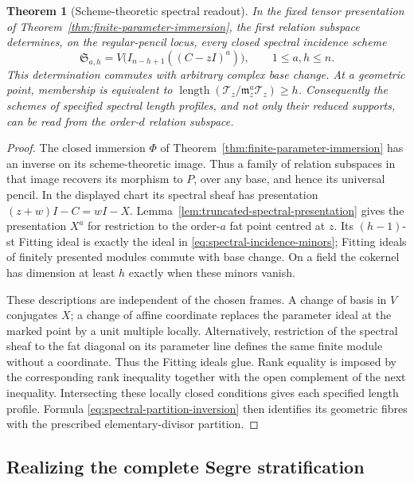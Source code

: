 \documentclass[11pt,reqno]{amsart}
\numberwithin{equation}{section}
\newtheorem{theorem}{Theorem}[section]
\theoremstyle{definition}\newtheorem{definition}[theorem]{Definition}
\theoremstyle{remark}\newtheorem{remark}[theorem]{Remark}
\DeclareMathOperator{\length}{length}
\begin{document}
\begin{theorem}[Scheme-theoretic spectral readout]
\label{thm:relative-spectral-readout}
In the fixed tensor presentation of
Theorem~\ref{thm:finite-parameter-immersion}, the first relation
subspace determines, on the regular-pencil locus, every closed
spectral incidence scheme
\begin{equation}\label{eq:spectral-incidence-minors}
 \mathfrak S_{a,h}
       =V\bigl(I_{n-h+1}((C-zI)^a)\bigr),
       \qquad 1\le a,h\le n.
\end{equation}
This determination commutes with arbitrary complex base change.
At a geometric point, membership is equivalent to
\(\length(\mathcal T_z/\mathfrak m_z^a\mathcal T_z)\ge h\).
Consequently the schemes of specified spectral length profiles, and
not only their reduced supports, can be read from the order-\(d\)
relation subspace.
\end{theorem}
\begin{proof}
The closed immersion \(\Phi\) of
Theorem~\ref{thm:finite-parameter-immersion} has an inverse on its
scheme-theoretic image.  Thus a family of relation subspaces in that
image recovers its morphism to \(P\), over any base, and hence its
universal pencil.  In the displayed chart its spectral sheaf has
presentation \((z+w)I-C=wI-X\).  Lemma~\ref{lem:truncated-spectral-presentation}
gives the presentation \(X^a\) for restriction to the order-\(a\)
fat point centred at \(z\).  Its \((h-1)\)-st Fitting ideal is
exactly the ideal in \eqref{eq:spectral-incidence-minors}; Fitting
ideals of finitely presented modules commute with base change.
On a field the cokernel has dimension at least \(h\) exactly when
these minors vanish.

These descriptions are independent of the chosen frames.  A change
of basis in \(V\) conjugates \(X\); a change of affine coordinate
replaces the parameter ideal at the marked point by a unit multiple
locally.  Alternatively, restriction of the spectral sheaf to the
fat diagonal on its parameter line defines the same finite module
without a coordinate.  Thus the Fitting ideals glue.  Rank equality
is imposed by the corresponding rank inequality together with the
open complement of the next inequality.  Intersecting these locally
closed conditions gives each specified length profile.  Formula
\eqref{eq:spectral-partition-inversion} then identifies its geometric
fibres with the prescribed elementary-divisor partition.
\end{proof}

\subsection{Realizing the complete Segre stratification}
\end{document}
